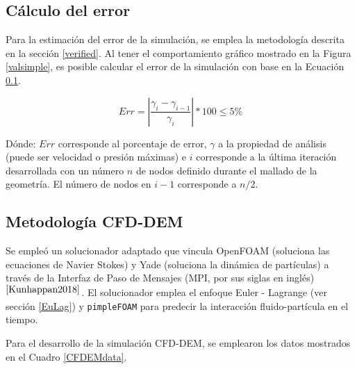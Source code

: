 



\subsection{C\'alculo del error} \label{errorSimu}

\noindent
\justify

Para la estimaci\'on del error de la simulaci\'on, se emplea la metodolog\'ia descrita en la secci\'on \ref{verified}. Al tener el comportamiento gr\'afico mostrado en la Figura \ref{valsimple}, es posible calcular el error de la simulaci\'on con base en la Ecuaci\'on \ref{errorSimu}.

\begin{equation}
	Err = \left| \frac{\gamma _i - \gamma _{i-1}}{\gamma _i} \right| *100 \leq 5 \%
	\label{errorSimu}
\end{equation}

\noindent
\justify

D\'onde: $Err$ corresponde al porcentaje de error, $\gamma$ a la propiedad de an\'alisis (puede ser velocidad o presi\'on m\'aximas) e $i$ corresponde a la \'ultima iteraci\'on desarrollada con un n\'umero $n$ de nodos definido durante el mallado de la geometr\'ia. El n\'umero de nodos en $i-1$ corresponde a $n/2$.

\subsection{Metodolog\'ia CFD-DEM}

\noindent
\justify

Se emple\'o un solucionador adaptado que vincula OpenFOAM (soluciona las ecuaciones de Navier Stokes) y Yade (soluciona la din\'amica de part\'iculas) a trav\'es de la Interfaz de Paso de Mensajes (MPI, por sus siglas en ingl\'es)$^{\cite{Kunhappan2018}}$. El solucionador emplea el enfoque Euler - Lagrange (ver secci\'on \ref{EuLag}) y \texttt{pimpleFOAM} para predecir la interacci\'on fluido-part\'icula en el tiempo.

\newpage

\noindent
\justify

Para el desarrollo de la simulaci\'on CFD-DEM, se emplearon los datos mostrados en el Cuadro \ref{CFDEMdata}.

